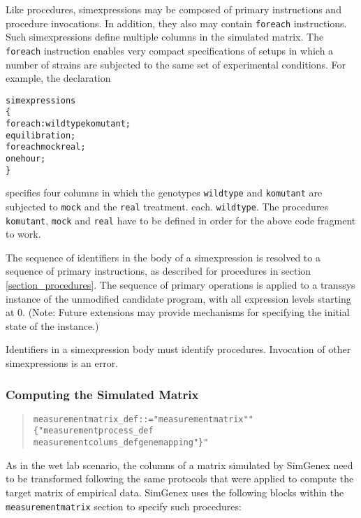\documentclass[a4paper,fleqn]{article}
\newcommand{\computercode}[1]{\texttt{#1}}
\newenvironment{ebnfrule}{\begin{footnotesize}\begin{quote}\begin{alltt}}{\end{alltt}\end{quote}\end{footnotesize}}
\begin{document}
Like procedures, simexpressions may be composed of primary instructions 
and procedure invocations. In addition, they also may contain 
\computercode{foreach} instructions. Such simexpressions define multiple 
columns in the simulated matrix. The \computercode{foreach} instruction 
enables very compact specifications of setups in which a number of strains are
subjected to the same set of experimental conditions. For example, the
declaration

\begin{alltt}
simexpression s
\{
  foreach: wildtype komutant;
  equilibration;
  foreach mock real;
  onehour;
\}
\end{alltt}
specifies four columns in which the genotypes \computercode{wildtype}
and \computercode{komutant} are subjected to \computercode{mock} and
the \computercode{real} treatment. each. \computercode{wildtype}. The
procedures \computercode{komutant}, \computercode{mock} and
\computercode{real} have to be defined in order for the above code
fragment to work.

The sequence of identifiers in the body of a simexpression is resolved
to a sequence of primary instructions, as described for procedures in
section \ref{section_procedures}. The sequence of primary operations
is applied to a transsys instance of the unmodified candidate program,
with all expression levels starting at $0$. (Note: Future extensions
may provide mechanisms for specifying the initial state of the instance.)

Identifiers in a simexpression body must identify procedures. 
Invocation of other simexpressions is an error.


\subsubsection{Computing the Simulated Matrix}

\begin{ebnfrule}
measurementmatrix_def ::= "measurementmatrix" "\{" measurementprocess_def 
measurementcolums_def genemapping"\}"
\end{ebnfrule}

As in the wet lab scenario, the columns of a matrix simulated by
SimGenex need to be transformed following the same protocols that were
applied to compute the target matrix of empirical data. SimGenex
uses the following blocks within the
\computercode{measurementmatrix} section to specify such procedures:
\end{document}

